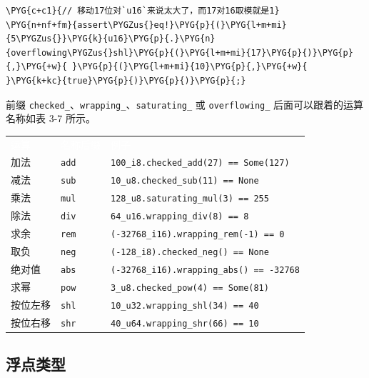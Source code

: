 \begin{itemize}
\begin{Verbatim}[commandchars=\\\{\},breaklines=true,breakanywhere=true,fontsize=\codefont,xleftmargin=17bp]
\PYG{c+c1}{// 移动17位对`u16`来说太大了，而17对16取模就是1}
\PYG{n+nf+fm}{assert\PYGZus{}eq!}\PYG{p}{(}\PYG{l+m+mi}{5\PYGZus{}}\PYG{k}{u16}\PYG{p}{.}\PYG{n}{overflowing\PYGZus{}shl}\PYG{p}{(}\PYG{l+m+mi}{17}\PYG{p}{)}\PYG{p}{,}\PYG{+w}{ }\PYG{p}{(}\PYG{l+m+mi}{10}\PYG{p}{,}\PYG{+w}{ }\PYG{k+kc}{true}\PYG{p}{)}\PYG{p}{)}\PYG{p}{;}
\end{Verbatim}

\end{itemize}

前缀 \texttt{checked\_}、\texttt{wrapping\_}、\texttt{saturating\_} 或 \texttt{overflowing\_} 后面可以跟着的运算名称如表 3-7 所示。


\myTableBegin
\begin{tabularx}{\textwidth}{@{}>{\hsize=0.600\hsize\raggedright\arraybackslash}X>{\hsize=0.785\hsize\raggedright\arraybackslash}X>{\hsize=1.615\hsize\raggedright\arraybackslash}X@{}}
\rowcolor{tabhead}\textcolor{white}{运算} & \textcolor{white}{名称后缀} & \textcolor{white}{例子} \\
加法 & \texttt{add} & \texttt{100\_i8.checked\_add(27) == Some(127)} \\
减法 & \texttt{sub} & \texttt{10\_u8.checked\_sub(11) == None} \\
乘法 & \texttt{mul} & \texttt{128\_u8.saturating\_mul(3) == 255} \\
除法 & \texttt{div} & \texttt{64\_u16.wrapping\_div(8) == 8} \\
求余 & \texttt{rem} & \texttt{(-32768\_i16).wrapping\_rem(-1) == 0} \\
取负 & \texttt{neg} & \texttt{(-128\_i8).checked\_neg() == None} \\
绝对值 & \texttt{abs} & \texttt{(-32768\_i16).wrapping\_abs() == -32768} \\
求幂 & \texttt{pow} & \texttt{3\_u8.checked\_pow(4) == Some(81)} \\
按位左移 & \texttt{shl} & \texttt{10\_u32.wrapping\_shl(34) == 40} \\
按位右移 & \texttt{shr} & \texttt{40\_u64.wrapping\_shr(66) == 10} \\
\end{tabularx}
\myTableEnd

\subsection{浮点类型}

